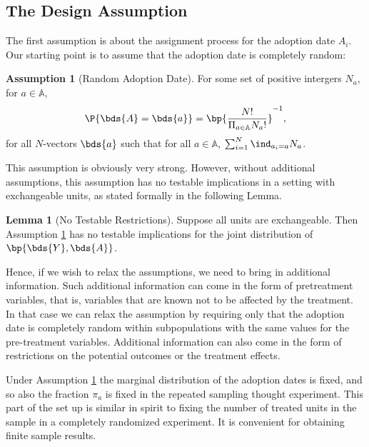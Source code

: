 \documentclass[12pt]{article}
\newcommand{\highlightP}[1]{{\emph{\color{MyPink}{#1}}}}
\theoremstyle{definition}
\newtheorem{assumption}{Assumption}
\newtheorem{lemma}[theorem]{Lemma}
\begin{document}
\subsection{The Design Assumption}

The first assumption is about the assignment process for the adoption date $A_i$. Our starting point is to assume that the adoption date is completely random:

\begin{assumption}[Random Adoption Date] \label{RAD}
    For some set of positive intergers $N_a$, for $a \in \mathbb{A}$, 
    $$
    \P{\bds{A} = \bds{a}} = \bp{\frac{N !}{\Pi_{a \in \mathbb{A}} N_a !}}^{-1},
    $$
    for all $N$-vectors $\bds{a}$ such that for all $a \in \mathbb{A}$, $\sum_{i=1}^{N} \ind_{a_i = a} N_a$.
\end{assumption}

This assumption is obviously very strong. However, without additional assumptions, this assumption has no testable implications in a setting with exchangeable units, as stated formally in the following Lemma.

\begin{lemma}[No Testable Restrictions]
    Suppose all units are exchangeable. Then Assumption \ref{RAD} has no testable implications for the joint distribution of $\bp{\bds{Y}, \bds{A}}$.    
\end{lemma}

Hence, if we wish to relax the assumptions, we need to bring in additional information. Such additional information can come in the form of pretreatment variables, that is, variables that are known not to be affected by the treatment. In that case we can relax the assumption by requiring only that the adoption date is completely random within subpopulations with the same values for the pre-treatment variables. Additional information can also come in the form of restrictions on the potential outcomes or the treatment effects. 

Under Assumption \ref{RAD} the marginal distribution of the adoption dates is fixed, and so also the fraction $\pi_a$ is fixed in the repeated sampling thought experiment. This part of the set up is similar in spirit to fixing the number of treated units in the sample in a completely randomized experiment. It is convenient for obtaining finite sample results. \highlightP{Note that it implies that the adoption dates for units $i$ and $j$ are not independent.}
\end{document}
